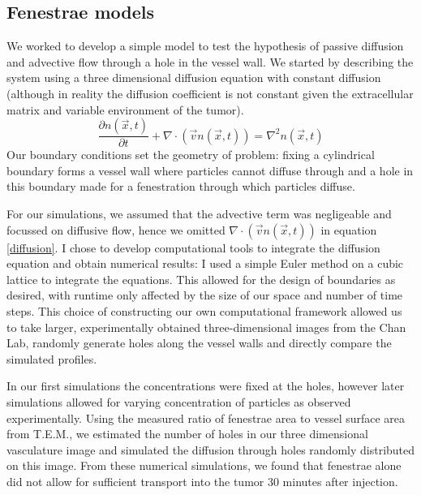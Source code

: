 \subsection{Fenestrae models}

We worked to develop a simple model to test the hypothesis of passive diffusion and advective flow through a hole in the vessel wall.
We started by describing the system using a three dimensional diffusion equation with constant diffusion (although in reality the diffusion coefficient is not constant given the extracellular matrix and variable environment of the tumor).
\begin{equation}\label{diffusion}
		\frac{\partial n(\vec{x},t)}{\partial t} + {\nabla \cdot (\vec{v}n(\vec{x},t))} = \nabla^2n(\vec{x},t)
\end{equation}
Our boundary conditions set the geometry of problem: fixing a cylindrical boundary forms a vessel wall where particles cannot diffuse through and a hole in this boundary made for a fenestration through which particles diffuse.

For our simulations, we assumed that the advective term was negligeable and focussed on diffusive flow, hence we omitted ${\nabla \cdot (\vec{v}n(\vec{x},t))}$ in equation \ref{diffusion}.
I chose to develop computational tools to integrate the diffusion equation and obtain numerical results: I used a simple Euler method on a cubic lattice to integrate the equations.
This allowed for the design of boundaries as desired, with runtime only affected by the size of our space and number of time steps.
This choice of constructing our own computational framework allowed us to take larger, experimentally obtained three-dimensional images from the Chan Lab, randomly generate holes along the vessel walls and directly compare the simulated profiles.

In our first simulations the concentrations were fixed at the holes, however later simulations allowed for varying concentration of particles as observed experimentally. Using the measured ratio of fenestrae area to vessel surface area from T.E.M., we estimated the number of holes in our three dimensional vasculature image and simulated the diffusion through holes randomly distributed on this image. From these numerical simulations, we found that fenestrae alone did not allow for sufficient transport into the tumor 30 minutes after injection.
